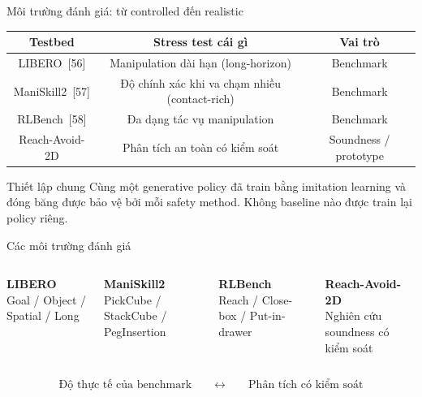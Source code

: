 \documentclass[aspectratio=169]{beamer}
\begin{document}
\begin{frame}[t,shrink=8]{Môi trường đánh giá: từ controlled đến realistic}

\begin{center}

\begin{tabular}{c|c|c}
\textbf{Testbed} & \textbf{Stress test cái gì} & \textbf{Vai trò} \\ \hline

LIBERO~[56]
&
Manipulation dài hạn (long-horizon)
&
Benchmark
\\[5pt]

ManiSkill2~[57]
&
Độ chính xác khi va chạm nhiều (contact-rich)
&
Benchmark
\\[5pt]

RLBench~[58]
&
Đa dạng tác vụ manipulation
&
Benchmark
\\[5pt]

Reach-Avoid-2D
&
Phân tích an toàn có kiểm soát
&
Soundness / prototype
\end{tabular}

\end{center}

\vspace{7pt}

\begin{alertblock}{Thiết lập chung}
Cùng một generative policy đã train bằng imitation learning và đóng băng
được bảo vệ bởi mỗi safety method. Không baseline nào được train lại policy riêng.
\end{alertblock}

\end{frame}

\begin{frame}[t,shrink=8]{Các môi trường đánh giá}

\begin{columns}[T]

\centering
\textbf{LIBERO}\\
\small
Goal / Object / Spatial / Long

\centering
\textbf{ManiSkill2}\\
\small
PickCube / StackCube / PegInsertion

\centering
\textbf{RLBench}\\
\small
Reach / Close-box / Put-in-drawer

\centering
\textbf{Reach-Avoid-2D}\\
\small
Nghiên cứu soundness có kiểm soát

\end{columns}

\vspace{10pt}

\begin{center}
\Large
\[
\text{Độ thực tế của benchmark}
\qquad\longleftrightarrow\qquad
\text{Phân tích có kiểm soát}
\]
\end{center}

\end{frame}
\end{document}
